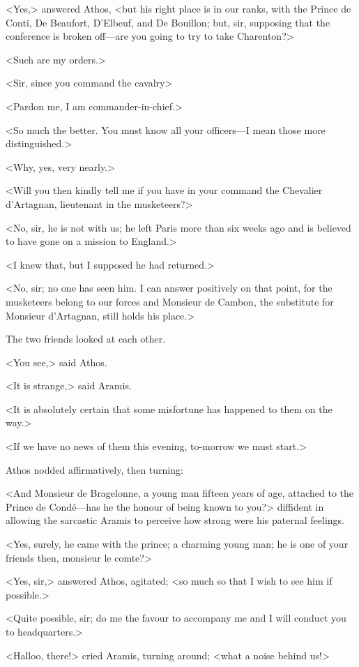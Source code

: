 <Yes,> answered Athos, <but his right place is in our ranks, with the Prince de Conti, De Beaufort, D'Elbeuf, and De Bouillon; but, sir, supposing that the conference is broken off—are you going to try to take Charenton?>

<Such are my orders.>

<Sir, since you command the cavalry\longdash>

<Pardon me, I am commander-in-chief.>

<So much the better. You must know all your officers—I mean those more distinguished.>

<Why, yes, very nearly.>

<Will you then kindly tell me if you have in your command the Chevalier d'Artagnan, lieutenant in the musketeers?>

<No, sir, he is not with us; he left Paris more than six weeks ago and is believed to have gone on a mission to England.>

<I knew that, but I supposed he had returned.>

<No, sir; no one has seen him. I can answer positively on that point, for the musketeers belong to our forces and Monsieur de Cambon, the substitute for Monsieur d'Artagnan, still holds his place.>

The two friends looked at each other.

<You see,> said Athos.

<It is strange,> said Aramis.

<It is absolutely certain that some misfortune has happened to them on the way.>

<If we have no news of them this evening, to-morrow we must start.>

Athos nodded affirmatively, then turning:

<And Monsieur de Bragelonne, a young man fifteen years of age, attached to the Prince de Condé—has he the honour of being known to you?> diffident in allowing the sarcastic Aramis to perceive how strong were his paternal feelings.

<Yes, surely, he came with the prince; a charming young man; he is one of your friends then, monsieur le comte?>

<Yes, sir,> answered Athos, agitated; <so much so that I wish to see him if possible.>

<Quite possible, sir; do me the favour to accompany me and I will conduct you to headquarters.>

<Halloo, there!> cried Aramis, turning around; <what a noise behind us!>

